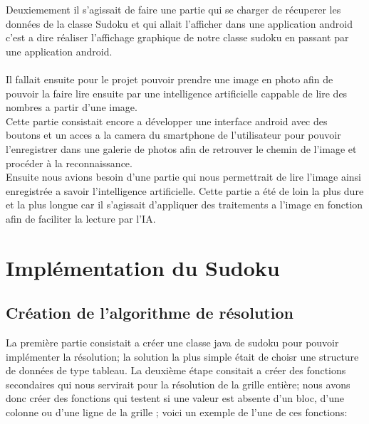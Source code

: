 \documentclass{article}
\begin{document}
Deuxiemement il s'agissait de faire une partie qui se charger de récuperer les données de la classe Sudoku et qui allait l'afficher dans une application android c'est a dire réaliser l'affichage graphique de notre classe sudoku en passant par une application android.\\\\
Il fallait ensuite pour le projet pouvoir prendre une image en photo afin de pouvoir la faire lire ensuite par une intelligence artificielle cappable de lire des nombres a partir d'une image.\\
Cette partie consistait encore a développer une interface android avec des boutons et un acces a la camera du smartphone de l'utilisateur pour pouvoir l'enregistrer dans une galerie de photos afin de  retrouver le chemin de l'image et procéder à la reconnaissance.\\

Ensuite nous avions besoin d'une partie qui nous permettrait de lire l'image ainsi enregistrée a savoir l'intelligence artificielle.
Cette partie a été de loin la plus dure et la plus longue car il s'agissait d'appliquer des traitements a l'image en fonction afin de faciliter la lecture par l'IA.




\subsection{}



\section{Implémentation du Sudoku}

\subsection{Création de l'algorithme de résolution}

La première partie consistait a créer une classe java de sudoku pour pouvoir implémenter la résolution; la solution la plus simple était de choisr une structure de données de type tableau.
\newline
\newline La deuxième étape consitait a créer des fonctions secondaires qui nous servirait pour la résolution de la grille entière; nous avons donc créer des fonctions qui testent si une valeur est absente d'un bloc, d'une colonne ou d'une ligne de la grille ; voici un exemple de l'une de ces fonctions:\\
\end{document}

